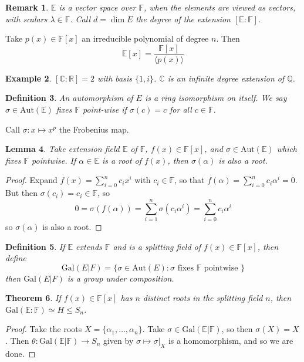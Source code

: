 \documentclass[a4paper,10pt]{article}
\newcommand{\CC}{\mathbb{C}}
\newcommand{\RR}{\mathbb{R}}
\newcommand{\QQ}{\mathbb{Q}}
\newcommand{\EE}{\mathbb{E}}
\newcommand{\FF}{\mathbb{F}}
\newtheorem{thm}{Theorem}
\newtheorem{Def}[thm]{Definition}
\newtheorem{eg}[thm]{Example}
\newtheorem{Lem}[thm]{Lemma}
\newtheorem{rem}[thm]{Remark}
\begin{document}
\begin{rem}
$\EE$ is a vector space over $\FF$, when the elements are viewed as vectors, with scalars $\lambda \in \FF$. Call $d = \dim E$ the degree of the extension $[\EE : \FF]$. 
\end{rem}

Take $p(x) \in \FF[x]$ an irreducible polynomial of degree $n$. Then
\[ \EE[x] = \frac{\FF[x]}{\langle p(x) \rangle} \]

\begin{eg}
$[\CC : \RR] = 2$ with basis $\{ 1, i\}$. $\CC$ is an infinite degree extension of $\QQ$. 
\end{eg}


\begin{Def}
An automorphism of $E$ is a ring isomorphism on itself. We say $\sigma \in \text{Aut}(\EE)$ fixes $\FF$ point-wise if $\sigma(c) = c$ for all $c \in \FF$. 
\end{Def}


Call $\sigma : x \mapsto x^p$ the Frobenius map. 


\begin{Lem}
Take extension field $\EE$ of $\FF$, $f(x) \in \FF[x]$, and $\sigma \in \text{Aut}(\EE)$ which fixes $\FF$ pointwise. If $\alpha \in \EE$ is a root of $f(x)$, then $\sigma(\alpha)$ is also a root. 
\end{Lem}

\begin{proof}
Expand $f(x) = \sum_{i = 0}^n c_i x^i$ with $c_i \in \FF$, so that $f(\alpha) = \sum_{i=0}^n c_i \alpha^i = 0$. But then $\sigma(c_i) = c_i \in \FF$, so
\[ 0 = \sigma( f(\alpha) ) = \sum_{i = 1}^n \sigma( c_i \alpha^i ) = \sum_{i = 0}^n c_i \alpha^i \]
so $\sigma(\alpha)$ is also a root.
\end{proof}

\begin{Def}
If $\EE$ extends $\FF$ and is a splitting field of $f(x) \in \FF[x]$, then define
\[ \text{Gal}(E | F) = \{ \sigma \in \text{Aut}(E) : \sigma \text{ fixes } \FF \text{ pointwise } \} \]
then $\text{Gal}(E | F)$ is a group under composition.
\end{Def}

\begin{thm}
If $f(x) \in \FF[x]$ has $n$ distinct roots in  the splitting field $n$, then $\text{Gal}(\EE : \FF) \simeq H \leq S_n$. 
\end{thm}

\begin{proof}
Take the roots $X = \{ \alpha_1, \dots, \alpha_n \}$. Take $\sigma \in \text{Gal}(\EE | \FF)$, so then $\sigma(X) = X$. Then $\theta : \text{Gal}(\EE | \FF) \rightarrow S_n$ given by $\sigma \mapsto \sigma |_X$ is a homomorphism, and so we are done.
\end{proof}
\end{document}

